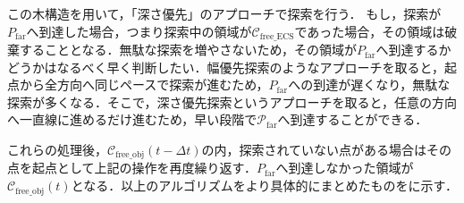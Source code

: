 \documentclass[a4paper,twoside,12pt,papersize, dvipdfmx]{iirthesis}
\begin{document}
この木構造を用いて，「深さ優先」のアプローチで探索を行う．
もし，探索が$P_{\mathrm {far}}$へ到達した場合，つまり探索中の領域が$\mathcal{C}_{\mathrm{free\_ECS}}$であった場合，その領域は破棄することとなる．無駄な探索を増やさないため，その領域が$P_{\mathrm {far}}$へ到達するかどうかはなるべく早く判断したい．幅優先探索のようなアプローチを取ると，起点から全方向へ同じペースで探索が進むため，$P_{\mathrm {far}}$への到達が遅くなり，無駄な探索が多くなる．そこで，深さ優先探索というアプローチを取ると，任意の方向へ一直線に進めるだけ進むため，早い段階で$\mathcal{P}_{\mathrm {far}}$へ到達することができる．\par

これらの処理後，$\mathcal{C}_{\mathrm{free\_obj}}(t-\Delta t)$の内，探索されていない点がある場合はその点を起点として上記の操作を再度繰り返す．$P_{\mathrm {far}}$へ到達しなかった領域が$\mathcal{C}_{\mathrm{free\_obj}}(t)$となる．以上のアルゴリズムをより具体的にまとめたものをに示す．
\end{document}
